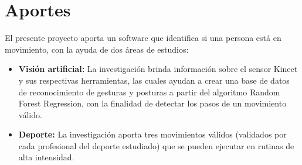 \section{Aportes}
El presente proyecto aporta un software que identifica si una persona est\'a en movimiento, con la ayuda de dos \'areas de estudios:
\begin{itemize}
	\item \textbf{Visi\'on artificial:} La investigaci\'on brinda informaci\'on sobre el sensor Kinect y sus respectivas herramientas, las cuales ayudan a crear una base de datos de reconocimiento de gesturas y posturas a partir del algoritmo Random Forest Regression, con la finalidad de detectar los pasos de un movimiento v\'alido.
	\item \textbf{Deporte:} La investigaci\'on aporta tres movimientos v\'alidos (validados por cada  profesional del deporte estudiado) que se pueden ejecutar en rutinas de alta intensidad.
\end{itemize}